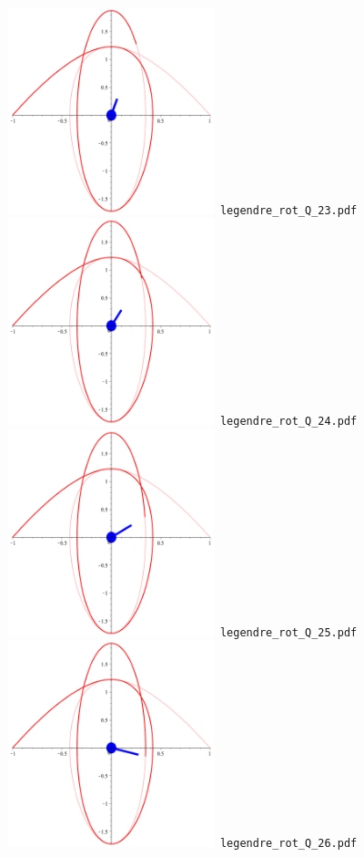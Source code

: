 \documentclass[a4paper]{amsart}
\begin{document}
\includegraphics[width=6cm]{legendre_rot_Q_23.pdf}\verb+ legendre_rot_Q_23.pdf+\\
\includegraphics[width=6cm]{legendre_rot_Q_24.pdf}\verb+ legendre_rot_Q_24.pdf+\\
\includegraphics[width=6cm]{legendre_rot_Q_25.pdf}\verb+ legendre_rot_Q_25.pdf+\\
\includegraphics[width=6cm]{legendre_rot_Q_26.pdf}\verb+ legendre_rot_Q_26.pdf+\\
\end{document}
